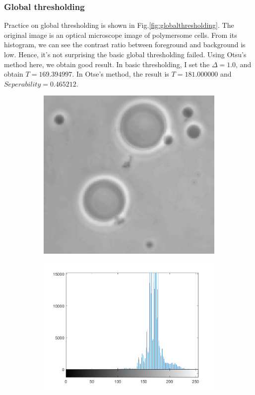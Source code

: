 \subsubsection{Global thresholding}
Practice on global thresholding is shown in Fig.\ref{fig:globalthresholding}. The original image is an optical microscope image of polymersome cells. From its histogram, we can see the contrast ratio between foreground and background is low. Hence, it's not surprising the basic global thresholding failed. Using Otsu's method here, we obtain good result. In basic thresholding, I set the $\Delta=1.0$, and obtain $T=169.394997$. In Otse's method, the result is $T=181.000000$ and $Seperability=0.465212$. 
\begin{figure}[h!]
	\centering
	\begin{subfigure}[b]{0.45\linewidth}
		\includegraphics[width=\linewidth]{myfigure/p9/polymersomes.png}
		\caption{}
		\label{fig:polymersomes}
	\end{subfigure}
	\begin{subfigure}[b]{0.45\linewidth}
    	\includegraphics[width=\linewidth]{myfigure/p9/9_polymersomes_hist.png}

\end{subfigure}
\end{figure}
